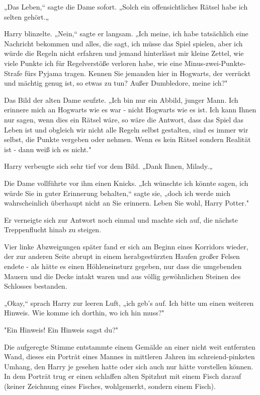 {„Das Leben,“ sagte die Dame sofort. „Solch ein offensichtliches Rätsel habe ich selten gehört.„

Harry blinzelte. „Nein,“ sagte er langsam. „Ich meine, ich habe tatsächlich eine Nachricht bekommen und alles, die sagt, ich müsse das Spiel spielen, aber ich würde die Regeln nicht erfahren und jemand hinterlässt mir kleine Zettel, wie viele Punkte ich für Regelverstöße verloren habe, wie eine Minus-zwei-Punkte-Strafe fürs Pyjama tragen. Kennen Sie jemanden hier in Hogwarts, der verrückt und mächtig genug ist, so etwas zu tun? Außer Dumbledore, meine ich?"

Das Bild der alten Dame seufzte. „Ich bin nur ein Abbild, junger Mann. Ich erinnere mich an Hogwarts wie es war - nicht Hogwarts wie es ist. Ich kann Ihnen nur sagen, wenn dies ein Rätsel wäre, so wäre die Antwort, dass das Spiel das Leben ist und obgleich wir nicht alle Regeln selbst gestalten, sind es immer wir selbst, die Punkte vergeben oder nehmen. Wenn es kein Rätsel sondern Realität ist - dann weiß ich es nicht."

Harry verbeugte sich sehr tief vor dem Bild. „Dank Ihnen, Milady.„

Die Dame vollführte vor ihm einen Knicks. „Ich wünschte ich könnte sagen, ich würde Sie in guter Erinnerung behalten,“ sagte sie, „doch ich werde mich wahrscheinlich überhaupt nicht an Sie erinnern. Leben Sie wohl, Harry Potter."

Er verneigte sich zur Antwort noch einmal und machte sich auf, die nächste Treppenflucht hinab zu steigen.

Vier linke Abzweigungen später fand er sich am Beginn eines Korridors wieder, der zur anderen Seite abrupt in einem herabgestürzten Haufen großer Felsen endete - als hätte es einen Höhleneinsturz gegeben, nur dass die umgebenden Mauern und die Decke intakt waren und aus völlig gewöhnlichen Steinen des Schlosses bestanden.

„Okay,“ sprach Harry zur leeren Luft, „ich geb's auf. Ich bitte um einen weiteren Hinweis. Wie komme ich dorthin, wo ich hin muss?"

"Ein Hinweis! Ein Hinweis sagst du?"

Die aufgeregte Stimme entstammte einem Gemälde an einer nicht weit entfernten Wand, dieses ein Porträt eines Mannes in mittleren Jahren im schreiend-pinksten Umhang, den Harry je gesehen hatte oder sich auch nur hätte vorstellen können. In dem Porträt trug er einen schlaffen alten Spitzhut mit einem Fisch darauf (keiner Zeichnung eines Fisches, wohlgemerkt, sondern einem Fisch).

}

